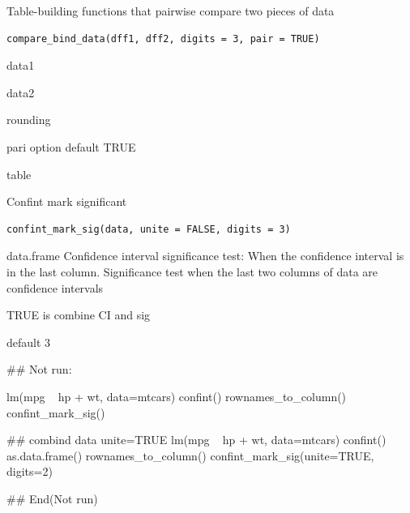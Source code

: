 \documentclass[a4paper]{book}
\begin{document}
%
\begin{Description}
Table-building functions that pairwise compare two pieces of data
\end{Description}
%
\begin{Usage}
\begin{verbatim}
compare_bind_data(dff1, dff2, digits = 3, pair = TRUE)
\end{verbatim}
\end{Usage}
%
\begin{Arguments}
\begin{ldescription}
\item[\code{dff1}] data1

\item[\code{dff2}] data2

\item[\code{digits}] rounding

\item[\code{pair}] pari option default TRUE
\end{ldescription}
\end{Arguments}
%
\begin{Value}
table
\end{Value}
%
\begin{Description}
Confint mark significant
\end{Description}
%
\begin{Usage}
\begin{verbatim}
confint_mark_sig(data, unite = FALSE, digits = 3)
\end{verbatim}
\end{Usage}
%
\begin{Arguments}
\begin{ldescription}
\item[\code{data}] data.frame Confidence interval significance test: When the confidence interval is in the last column.  Significance test when the last two columns of data are confidence intervals

\item[\code{unite}] TRUE is combine CI and sig

\item[\code{digits}] default 3
\end{ldescription}
\end{Arguments}
%
\begin{Examples}
\begin{ExampleCode}

## Not run: 

lm(mpg ~ hp + wt, data=mtcars)%
 confint()%
  rownames_to_column()%
  confint_mark_sig()

## combind data unite=TRUE
  lm(mpg ~ hp + wt, data=mtcars)%
     confint()%
     as.data.frame()%
     rownames_to_column()%
     confint_mark_sig(unite=TRUE, digits=2)



  
## End(Not run)

\end{ExampleCode}
\end{Examples}
\end{document}
